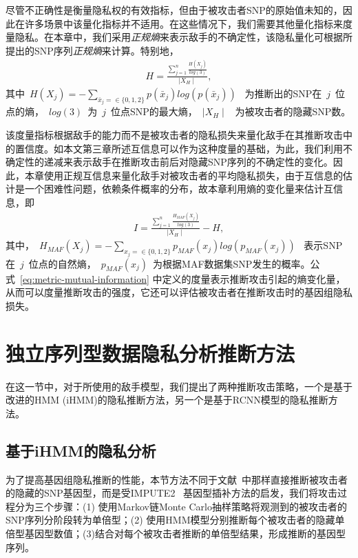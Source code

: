 尽管不正确性是衡量隐私权的有效指标，但由于被攻击者SNP的原始值未知的，因此在许多场景中该量化指标并不适用。在这些情况下，我们需要其他量化指标来度量隐私。在本章中，我们采用\textit{正规熵}来表示敌手的不确定性，该隐私量化可根据所提出的SNP序列\textit{正规熵}来计算。特别地，
\begin{align}\label{eq:metric-entropy}
H = \frac{\sum_{j=1}^n \frac{H(X_j)}{log(3)}}{\mid X_H \mid},
\end{align}
其中~$H(X_j)= -\sum_{\bar{x}_j=\in \{0,1,2\}}{p(\bar{x}_j)log(p(\bar{x}_j))}$~ 为推断出的SNP在~$j$~位点的熵，~$log(3)$~为~$j$~位点SNP的最大熵，~$\mid X_H \mid$~ 为被攻击者的隐藏SNP数。

该度量指标根据敌手的能力而不是被攻击者的隐私损失来量化敌手在其推断攻击中的置信度。如本文第三章所述互信息可以作为这种度量的基础，为此，我们利用不确定性的递减来表示敌手在推断攻击前后对隐藏SNP序列的不确定性的变化。因此，本章使用正规互信息来量化敌手对被攻击者的平均隐私损失，由于互信息的估计是一个困难性问题，依赖条件概率的分布，故本章利用熵的变化量来估计互信息，即
\begin{align}\label{eq:metric-mutual-information}
I = \frac{\sum_{j=1}^n \frac{H_{MAF}(X_j)}{log(3)}}{\mid X_H \mid}
- H,
\end{align}
其中，~$H_{MAF}(X_j) = -\sum_{x_j=\in \{0,1,2\}}{p_{MAF}(x_j)log(p_{MAF}(x_j))}$~ 表示SNP在~$j$~位点的自然熵，~$p_{MAF}(x_j)$~为根据MAF数据集SNP发生的概率。公式~\ref{eq:metric-mutual-information} 中定义的度量表示推断攻击引起的熵变化量，从而可以度量推断攻击的强度，它还可以评估被攻击者在推断攻击时的基因组隐私损失。

\section{独立序列型数据隐私分析推断方法}\label{sec:infer}

在这一节中，对于所使用的敌手模型，我们提出了两种推断攻击策略，一个是基于改进的HMM (iHMM)的隐私推断方法，另一个是基于RCNN模型的隐私推断方法。

\subsection{基于iHMM的隐私分析}

为了提高基因组隐私推断的性能，本节方法不同于文献~\cite{samani2015quantifying}中那样直接推断被攻击者的隐藏的SNP基因型，而是受IMPUTE2 ~\cite{howie2009flexible}基因型插补方法的启发，我们将攻击过程分为三个步骤：(1) 使用Markov链Monte Carlo抽样策略将观测到的被攻击者的SNP序列分阶段转为单倍型；(2) 使用HMM模型分别推断每个被攻击者的隐藏单倍型基因型数值；(3)结合对每个被攻击者推断的单倍型结果，形成推断的基因型序列。


